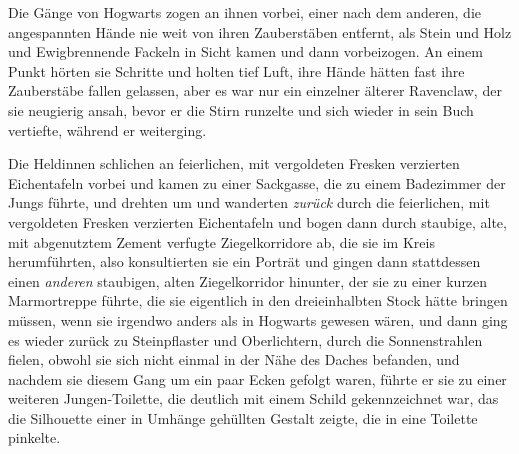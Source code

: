 Die Gänge von Hogwarts zogen an ihnen vorbei, einer nach dem anderen, die angespannten Hände nie weit von ihren Zauberstäben entfernt, als Stein und Holz und Ewigbrennende Fackeln in Sicht kamen und dann vorbeizogen. An einem Punkt hörten sie Schritte und holten tief Luft, ihre Hände hätten fast ihre Zauberstäbe fallen gelassen, aber es war nur ein einzelner älterer Ravenclaw, der sie neugierig ansah, bevor er die Stirn runzelte und sich wieder in sein Buch vertiefte, während er weiterging.

Die Heldinnen schlichen an feierlichen, mit vergoldeten Fresken verzierten Eichentafeln vorbei und kamen zu einer Sackgasse, die zu einem Badezimmer der Jungs führte, und drehten um und wanderten \emph{zurück} durch die feierlichen, mit vergoldeten Fresken verzierten Eichentafeln und bogen dann durch staubige, alte, mit abgenutztem Zement verfugte Ziegelkorridore ab, die sie im Kreis herumführten, also konsultierten sie ein Porträt und gingen dann stattdessen einen \emph{anderen} staubigen, alten Ziegelkorridor hinunter, der sie zu einer kurzen Marmortreppe führte, die sie eigentlich in den dreieinhalbten Stock hätte bringen müssen, wenn sie irgendwo anders als in Hogwarts gewesen wären, und dann ging es wieder zurück zu Steinpflaster und Oberlichtern, durch die Sonnenstrahlen fielen, obwohl sie sich nicht einmal in der Nähe des Daches befanden, und nachdem sie diesem Gang um ein paar Ecken gefolgt waren, führte er sie zu einer weiteren Jungen-Toilette, die deutlich mit einem Schild gekennzeichnet war, das die Silhouette einer in Umhänge gehüllten Gestalt zeigte, die in eine Toilette pinkelte.

